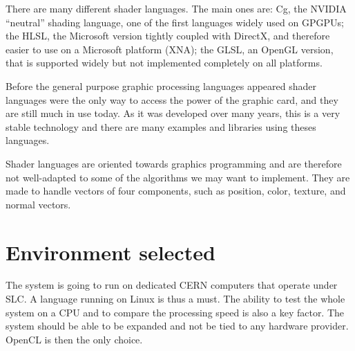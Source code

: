 There are many different shader languages. The main ones are: Cg, the NVIDIA ``neutral'' shading language, one of the first languages widely used on \glspl{GPGPU}; the \gls{HLSL}, the Microsoft version tightly coupled with DirectX, and therefore easier to use on a Microsoft platform (XNA); the \gls{GLSL}, an \gls{OpenGL} version, that is supported widely but not implemented completely on all platforms. 

Before the general purpose graphic processing languages appeared shader languages were the only way to access the power of the graphic card, and they are still much in use today. As it was developed over many years, this is a very stable technology and there are many examples and libraries using theses languages.

Shader languages are oriented towards graphics programming and are therefore not well-adapted to some of the algorithms we may want to implement. They are made to handle vectors of four components, such as position, color, texture, and normal vectors.

\section{Environment selected}

The system is going to run on dedicated \gls{CERN} computers that operate under \gls{SLC}. A language running on Linux is thus a must. The ability to test the whole system on a \gls{CPU} and to compare the processing speed is also a key factor. The system should be able to be expanded and not be tied to any hardware provider. \Gls{OpenCL} is then the only choice.

